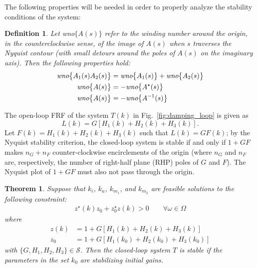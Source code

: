 \documentclass[a4paper, 10pt, conference]{ieeeconf}
\newtheorem{theorem}{Theorem}
\newtheorem{definition}{Definition}
\begin{document}
The following properties will be needed in order to properly analyze the stability conditions of the system:
\begin{definition}
Let \emph{wno}$\{ A(s)\}$ refer to the winding number around the origin, in the counterclockwise sense, of the image of $A(s)$  when $s$ traverses the Nyquist contour (with small detours around the poles of $A(s)$ on the imaginary axis). Then the following properties hold:
\begin{align}
\emph{wno}\bigl\{ A_1(s)A_2(s) \bigr\} &= \emph{wno}\bigl\{ A_1(s) \bigr\} + \emph{wno}\bigl\{ A_2(s) \bigr\}  \label{eq:wno_add}\\ 
\emph{wno}\bigl\{ A(s)\bigr\} &= -\emph{wno}\bigl\{ A^{\star}(s)\bigr\} \label{eq:wno_conj} \\ 
\emph{wno}\bigl\{ A(s)\bigr\} &= -\emph{wno}\bigl\{ A^{-1}(s)\bigr\} \label{eq:wno_inv}
\end{align}
\end{definition}
The open-loop FRF of the system $T(k)$ in Fig.~\ref{fig:damping_loop} is given as $$L(k) = G[H_1(k)+H_2(k)+H_3(k)].$$ Let $F(k) = H_1(k)+H_2(k)+H_3(k)$ such that $L(k) = GF(k)$; by the Nyquist stability criterion, the closed-loop system is stable if and only if $1+GF$ makes $n_{G}+n_F$ counter-clockwise encirclements of the origin (where $n_{G}$ and $n_F$ are, respectively, the number of right-half plane (RHP) poles of $G$ and $F$). The Nyquist plot of $1+GF$ must also not pass through the origin.

\begin{theorem} \label{Thm1}
Suppose that $k_i$, $k_u$, $k_{m_1}$, and $k_{m_2}$ are feasible solutions to the following constraint:
\begin{equation} \label{eq:theorem1_cond}
\begin{split}
z^{\star}(k)z_0+z_0^{\star}z(k) > 0 \qquad 
\forall \omega \in \Omega
\end{split}
\end{equation}
where 
\begin{align*}
z(k) &= 1+G[H_1(k)+H_2(k)+H_3(k)] \\
z_0 &= 1+G[H_1(k_0)+H_2(k_0)+H_3(k_0)]
\end{align*}
with $\{G,H_1,H_2,H_3\} \in \mathscr{S}$. Then the closed-loop system $T$ is stable if the parameters in the set $k_0$ are stabilizing initial gains.
\end{theorem}
\end{document}
